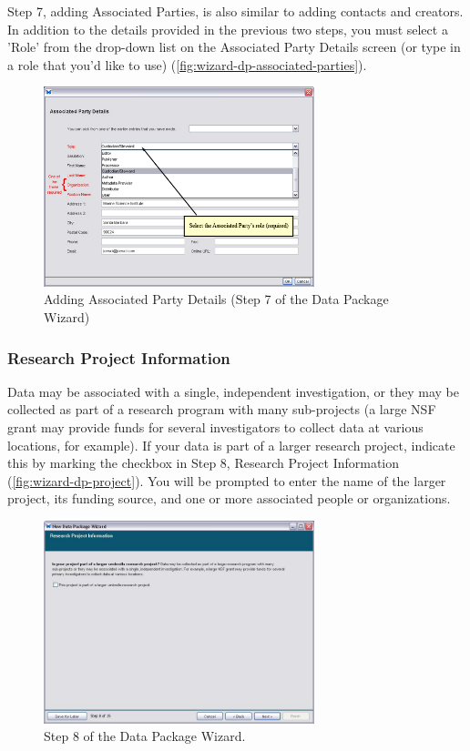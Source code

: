 Step 7, adding Associated Parties, is also similar to adding contacts
and creators. In addition to the details provided in the previous two
steps, you must select a 'Role' from the drop-down list on the
Associated Party Details screen (or type in a role that you'd like to
use) (\autoref{fig:wizard-dp-associated-parties}).

\begin{figure}
  \centering
    \includegraphics[width=0.7\textwidth]{images/wizard-dp-associated-parties.jpg}
  \caption{Adding Associated Party Details (Step 7 of the Data Package
    Wizard)}
  \label{fig:wizard-dp-associated-parties}
\end{figure}

\subsubsection{Research Project Information} \label{sec:wizard-dp-project}

Data may be associated with a single, independent investigation, or they
may be collected as part of a research program with many sub-projects (a
large NSF grant may provide funds for several investigators to collect
data at various locations, for example). If your data is part of a
larger research project, indicate this by marking the checkbox in Step
8, Research Project Information (\autoref{fig:wizard-dp-project}). You
will be prompted to enter the name of the larger project, its funding
source, and one or more associated people or organizations. 

\begin{figure}
  \centering
    \includegraphics[width=0.7\textwidth]{images/wizard-dp-project.jpg}
  \caption{Step 8 of the Data Package Wizard.}
  \label{fig:wizard-dp-project}
\end{figure}

